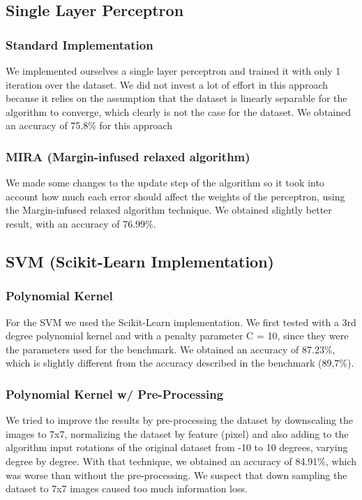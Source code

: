 \documentclass[twoside,twocolumn]{article}
\begin{document}
\subsection{Single Layer Perceptron}

\subsubsection{Standard Implementation}

We implemented ourselves a single layer perceptron and trained it with only 1 iteration over the dataset.
We did not invest a lot of effort in this approach because it relies on the assumption that the dataset
is linearly separable for the algorithm to converge, which clearly is not the case for the dataset.
We obtained an accuracy of 75.8\% for this approach

\subsubsection{MIRA (Margin-infused relaxed algorithm)}

We made some changes to the update step of the algorithm so it took into account how much
each error should affect the weights of the perceptron, using the Margin-infused relaxed algorithm
technique. We obtained slightly better result, with an accuracy of 76.99\%.

\subsection{SVM (Scikit-Learn Implementation)}

\subsubsection{Polynomial Kernel}

For the SVM we used the Scikit-Learn implementation. We first tested with a 3rd degree polynomial kernel and with a penalty parameter C = 10, since
they were the parameters used for the benchmark. We obtained an accuracy of 87.23\%, which is slightly different from the accuracy described in the benchmark (89,7\%).

\subsubsection{Polynomial Kernel w/ Pre-Processing}

We tried to improve the results by pre-processing the dataset by downscaling the images to 7x7, normalizing the dataset by feature (pixel) and also adding
to the algorithm input rotations of the original dataset from -10 to 10 degrees, varying degree by degree.
With that technique, we obtained an accuracy of 84.91\%, which was worse than without the pre-processing. We suspect that down sampling the dataset
to 7x7 images caused too much information loss.
\end{document}
